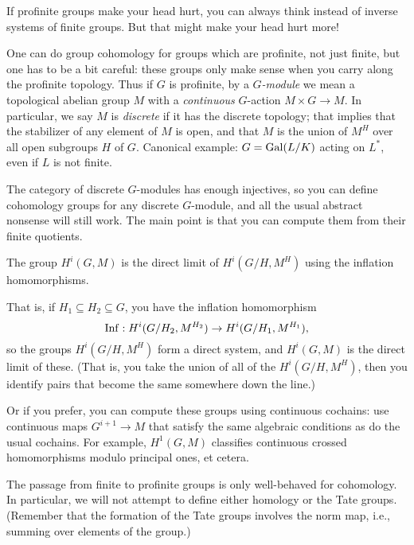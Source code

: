  If profinite groups make your head hurt, you can
always think instead of inverse systems of finite groups. But that might
make your head hurt more!


One can do group cohomology for groups which are profinite, not just finite,
but one has to be a bit careful: these groups only make sense when you
carry along the profinite topology. Thus if $G$ is profinite, by a \emph{$G$-module}
we mean a topological abelian group $M$ with a \emph{continuous} $G$-action
$M \times G \to M$. In particular, we say $M$ is \emph{discrete} if it
has the discrete topology; that implies that the stabilizer of any element of
$M$ is open, and that $M$ is the union of $M^H$ over all open subgroups
$H$ of $G$. Canonical example: $G = \operatorname{Gal}(L/K)$ acting on $L^*$, even if $L$
is not finite.

The category of discrete $G$-modules has enough injectives, so you can
define cohomology groups for any discrete $G$-module, and all the usual
abstract nonsense will still work. The main point is that you can compute them
from their finite quotients.
\begin{prop}
The group $H^i(G, M)$ is the direct limit of 
$H^i(G/H, M^H)$ using the inflation homomorphisms.
\end{prop}
That is, if $H_1 \subseteq H_2 \subseteq G$, you have the inflation
homomorphism
\[
\operatorname{Inf}: H^i(G/H_2, M^{H_2}) \to H^i(G/H_1, M^{H_1}),
\]
so the groups $H^i(G/H, M^H)$ form a direct system,
and $H^i(G,M)$ is the direct limit of these. (That is, you take the union
of all of the $H^i(G/H, M^H)$, then you identify pairs that become the
same somewhere down the line.)

Or if you prefer, you can compute these groups using continuous cochains:
use continuous maps $G^{i+1} \to M$ that satisfy the same algebraic
conditions as do the usual cochains. For example, $H^1(G,M)$ classifies
continuous crossed homomorphisms modulo principal ones, et cetera.

 The passage from finite to profinite groups is only
well-behaved for cohomology. In particular, we will not attempt to define
either homology or the Tate groups. (Remember that the formation of the
Tate groups involves the norm map, i.e., summing over elements of the group.)


